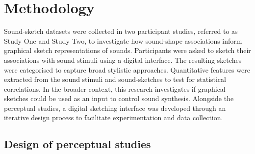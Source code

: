 \documentclass[]{interact}
\theoremstyle{plain}%
\theoremstyle{definition}
\theoremstyle{remark}
\begin{document}
\section{Methodology}\label{sec:methodology}

Sound-sketch datasets were collected in two participant studies, referred to as Study One and Study Two, to investigate how sound-shape associations inform graphical sketch representations of sounds. Participants were asked to sketch their associations with sound stimuli using a digital interface. The resulting sketches were categorised to capture broad stylistic approaches. Quantitative features were extracted from the sound stimuli and sound-sketches to test for statistical correlations. In the broader context, this research investigates if graphical sketches could be used as an input to control sound synthesis. Alongside the perceptual studies, a digital sketching interface was developed through an iterative design process to facilitate experimentation and data collection.

\subsection{Design of perceptual studies}\label{sec:study_design}
\end{document}
